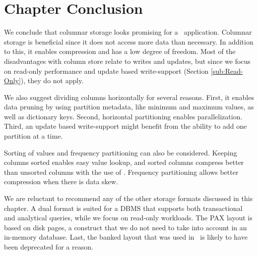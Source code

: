 \section{Chapter Conclusion}
\label{sec:Chapter Conclusion}
We conclude that columnar storage looks promising for a \bd~application. Columnar storage is beneficial since it does not access more data than necessary. In addition to this, it enables compression and has a low degree of freedom. Most of the disadvantages with column store relate to writes and updates, but since we focus on read-only performance and update based write-support (Section \ref{sub:Read-Only}), they do not apply.

We also suggest dividing columns horizontally for several reasons. First, it enables data pruning by using partition metadata, like minimum and maximum values, as well as dictionary keys. Second, horizontal partitioning enables parallelization. Third, an update based write-support might benefit from the ability to add one partition at a time.

Sorting of values and frequency partitioning can also be considered. Keeping columns sorted enables easy value lookup, and sorted columns compress better than unsorted columns with the use of \rle. Frequency partitioning allows better compression when there is data skew.

We are reluctant to recommend any of the other storage formats discussed in this chapter. A dual format is suited for a DBMS that supports both transactional and analytical queries, while we focus on read-only workloads. The PAX layout is based on disk pages, a construct that we do not need to take into account in an in-memory database. Last, the banked layout that was used in \blink~is likely to have been deprecated for a reason.

